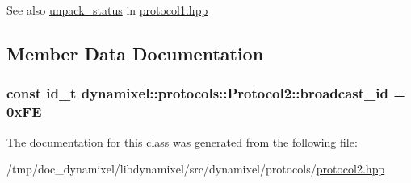 \begin{DoxySeeAlso}{See also}
\hyperlink{classdynamixel_1_1protocols_1_1_protocol2_adb5a8db2d554a4ee83f069f690d41f30}{unpack\+\_\+status} in \hyperlink{protocol1_8hpp}{protocol1.\+hpp} 
\end{DoxySeeAlso}


\subsection{Member Data Documentation}
\subsubsection[{\texorpdfstring{broadcast\+\_\+id}{broadcast_id}}]{\setlength{\rightskip}{0pt plus 5cm}const {\bf id\+\_\+t} dynamixel\+::protocols\+::\+Protocol2\+::broadcast\+\_\+id = 0x\+FE\hspace{0.3cm}{\ttfamily [static]}}\hypertarget{classdynamixel_1_1protocols_1_1_protocol2_a1b0fd8890068abff759e758b27cf7869}{}\label{classdynamixel_1_1protocols_1_1_protocol2_a1b0fd8890068abff759e758b27cf7869}


The documentation for this class was generated from the following file\+:\begin{DoxyCompactItemize}
\item 
/tmp/doc\+\_\+dynamixel/libdynamixel/src/dynamixel/protocols/\hyperlink{protocol2_8hpp}{protocol2.\+hpp}\end{DoxyCompactItemize}
